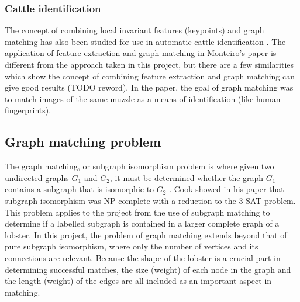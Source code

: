 \subsubsection{Cattle identification}
The concept of combining local invariant features (keypoints) and graph matching has also been studied for use in automatic cattle identification \cite{cattle}. The application of feature extraction and graph matching in Monteiro's paper is different from the approach taken in this project, but there are a few similarities which show the concept of combining feature extraction and graph matching can give good results (TODO reword). 
\n
In the paper, the goal of graph matching was to match images of the same muzzle as a means of identification (like human fingerprints). 

\subsection{Graph matching problem}
The graph matching, or subgraph isomorphism problem is where given two undirected graphs $G_1$ and $G_2$, it must be determined whether the graph $G_1$ contains a subgraph that is isomorphic to $G_2$ \cite{subgraph}. Cook showed in his paper that subgraph isomorphism was NP-complete with a reduction to the 3-SAT problem. This problem applies to the project from the use of subgraph matching to determine if a labelled subgraph is contained in a larger complete graph of a lobster. 
\n
In this project, the problem of graph matching extends beyond that of pure subgraph isomorphism, where only the number of vertices and its connections are relevant. Because the shape of the lobster is a crucial part in determining successful matches, the size (weight) of each node in the graph and the length (weight) of the edges are all included as an important aspect in matching. 